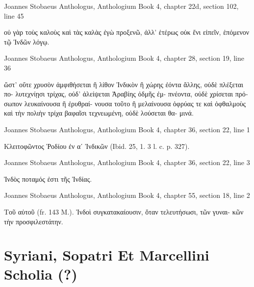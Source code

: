 \documentclass[12pt,letterpaper,twoside,final]{memoir}
\begin{document}
\begin{greek}
Joannes Stobaeus Anthologus, Anthologium 
Book 4, chapter 22d, section 102, line 45

                                     οὐ γὰρ τοὺς καλοὺς 
καὶ τὰς καλὰς ἐγὼ προξενῶ, ἀλλ' ἑτέρως οὐκ ἔνι εἰπεῖν, 
ἑπόμενον τῷ Ἰνδῶν λόγῳ. 



Joannes Stobaeus Anthologus, Anthologium 
Book 4, chapter 28, section 19, line 36

                               ὥστ' οὔτε χρυσὸν ἀμφιθήσεται 
ἢ λίθον Ἰνδικὸν ἢ χώρης ἐόντα ἄλλης, οὐδὲ πλέξεται πο-
λυτεχνίῃσι τρίχας, οὐδ' ἀλείψεται Ἀραβίης ὀδμῆς ἐμ-
πνέοντα, οὐδὲ χρίσεται πρόσωπον λευκαίνουσα ἢ ἐρυθραί-
νουσα τοῦτο ἢ μελαίνουσα ὀφρύας τε καὶ ὀφθαλμοὺς καὶ 
τὴν πολιὴν τρίχα βαφαῖσι τεχνεωμένη, οὐδὲ λούσεται θα-
μινά. 



Joannes Stobaeus Anthologus, Anthologium 
Book 4, chapter 36, section 22, line 1

Κλειτοφῶντος Ῥοδίου ἐν αʹ Ἰνδικῶν (Ibid. 
25, 1. 3 l. c. p. 327). 



Joannes Stobaeus Anthologus, Anthologium 
Book 4, chapter 36, section 22, line 3

Ἰνδὸς ποταμός ἐστι τῆς Ἰνδίας. 



Joannes Stobaeus Anthologus, Anthologium 
Book 4, chapter 55, section 18, line 2

Τοῦ αὐτοῦ (fr. 143 M.). 
 Ἰνδοὶ συγκατακαίουσιν, ὅταν τελευτήσωσι, τῶν γυναι-
κῶν τὴν προσφιλεστάτην. 

\end{greek}



\section{Syriani, Sopatri Et Marcellini Scholia (?)}
\end{document}
